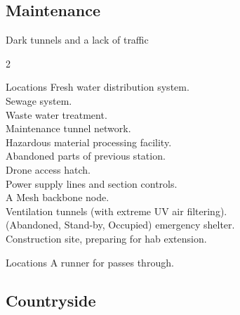 \documentclass[a4]{book}
\begin{document}
\begin{multicols}{2}


\subsection*{Maintenance}

Dark tunnels and a lack of traffic 

\end{multicols}{2}

\begin{tableone}{Locations}
Fresh water distribution system.\\
Sewage system.\\
Waste water treatment.\\
Maintenance tunnel network.\\
Hazardous material processing facility.\\
Abandoned parts of previous station.\\
Drone access hatch.\\
Power supply lines and section controls.\\
A Mesh backbone node.\\
Ventilation tunnels (with extreme UV air filtering).\\
(Abandoned, Stand-by, Occupied) emergency shelter.\\
Construction site, preparing for hab extension.\\
\end{tableone}

\begin{tableone}{Locations}
A runner for  passes through.\\
\end{tableone}






\subsection*{Countryside}
\end{document}
